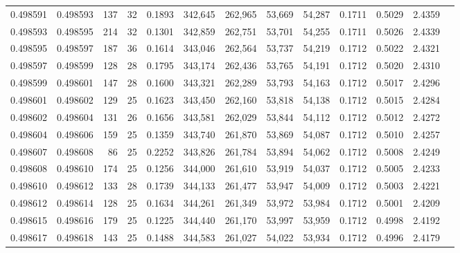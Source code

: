 \begin{tabular}{rrrrrrrrrrrrr}
0.498591 & 0.498593 & 137 &  32 &                                     0.1893 & 342,645 & 262,965 &  53,669 &  54,287 & 0.1711 & 0.5029 & 2.4359 \\
0.498593 & 0.498595 & 214 &  32 &                                     0.1301 & 342,859 & 262,751 &  53,701 &  54,255 & 0.1711 & 0.5026 & 2.4339 \\
0.498595 & 0.498597 & 187 &  36 &                                     0.1614 & 343,046 & 262,564 &  53,737 &  54,219 & 0.1712 & 0.5022 & 2.4321 \\
0.498597 & 0.498599 & 128 &  28 &                                     0.1795 & 343,174 & 262,436 &  53,765 &  54,191 & 0.1712 & 0.5020 & 2.4310 \\
0.498599 & 0.498601 & 147 &  28 &                                     0.1600 & 343,321 & 262,289 &  53,793 &  54,163 & 0.1712 & 0.5017 & 2.4296 \\
0.498601 & 0.498602 & 129 &  25 &                                     0.1623 & 343,450 & 262,160 &  53,818 &  54,138 & 0.1712 & 0.5015 & 2.4284 \\
0.498602 & 0.498604 & 131 &  26 &                                     0.1656 & 343,581 & 262,029 &  53,844 &  54,112 & 0.1712 & 0.5012 & 2.4272 \\
0.498604 & 0.498606 & 159 &  25 &                                     0.1359 & 343,740 & 261,870 &  53,869 &  54,087 & 0.1712 & 0.5010 & 2.4257 \\
0.498607 & 0.498608 &  86 &  25 &                                     0.2252 & 343,826 & 261,784 &  53,894 &  54,062 & 0.1712 & 0.5008 & 2.4249 \\
0.498608 & 0.498610 & 174 &  25 &                                     0.1256 & 344,000 & 261,610 &  53,919 &  54,037 & 0.1712 & 0.5005 & 2.4233 \\
0.498610 & 0.498612 & 133 &  28 &                                     0.1739 & 344,133 & 261,477 &  53,947 &  54,009 & 0.1712 & 0.5003 & 2.4221 \\
0.498612 & 0.498614 & 128 &  25 &                                     0.1634 & 344,261 & 261,349 &  53,972 &  53,984 & 0.1712 & 0.5001 & 2.4209 \\
0.498615 & 0.498616 & 179 &  25 &                                     0.1225 & 344,440 & 261,170 &  53,997 &  53,959 & 0.1712 & 0.4998 & 2.4192 \\
0.498617 & 0.498618 & 143 &  25 &                                     0.1488 & 344,583 & 261,027 &  54,022 &  53,934 & 0.1712 & 0.4996 & 2.4179 \\

\end{tabular}
